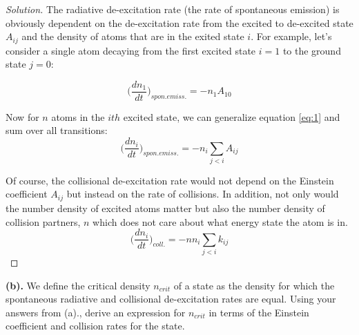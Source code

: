 \documentclass[10pt]{article}
\begin{document}
\begin{proof}[Solution]
The radiative de-excitation rate (the rate of spontaneous emission) is obviously dependent on the de-excitation rate from the excited to de-excited state $A_{ij}$ and the density of atoms that are in the exited state $i$. For example, let's consider a single atom decaying from the first excited state $i=1$ to the ground state $j=0$:

\begin{equation}
\label{eq:1}
\bigg(\frac{dn_{1}}{dt}\bigg)_{spon.emiss.} = -n_{1}A_{10}
\end{equation}

\noindent Now for $n$ atoms in the $ith$ excited state, we can generalize equation \eqref{eq:1} and sum over all transitions:
\begin{equation}
\label{eq:2}
\bigg(\frac{dn_{i}}{dt}\bigg)_{spon.emiss.} = -n_{i}\sum_{j < i}A_{ij}
\end{equation}

\noindent Of course, the collisional de-excitation rate would not depend on the Einstein coefficient $A_{ij}$ but instead on the rate of collisions. In addition, not only would the number density of excited atoms matter but also the number density of collision partners, $n$ which does not care about what energy state the atom is in.
\begin{equation}
\label{eq:3}
\bigg(\frac{dn_{i}}{dt}\bigg)_{coll.} = -nn_{i}\sum_{j < i}k_{ij}
\end{equation}

\end{proof}

\noindent\textbf{(b).} We define the critical density $n_{crit}$ of a state as the density for which the spontaneous radiative and collisional de-excitation rates are equal. Using your answers from (a)., derive an expression for $n_{crit}$ in terms of the Einstein coefficient and collision rates for the state.
\end{document}
